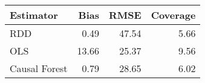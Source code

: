 \begin{table}[ht]
\centering
\begin{tabular}{lrrr}
  \hline
Estimator & Bias & RMSE & Coverage \\ 
  \hline
RDD & 0.49 & 47.54 & 5.66 \\ 
  OLS & 13.66 & 25.37 & 9.56 \\ 
  Causal Forest & 0.79 & 28.65 & 6.02 \\ 
   \hline
\end{tabular}
\end{table}
